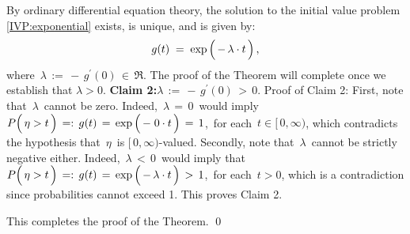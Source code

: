 \vskip 0.3cm
\noindent
By ordinary differential equation theory, the solution to the initial value problem \eqref{IVP:exponential}
exists, is unique, and is given by:
\begin{equation*}
g(t) \; = \; \exp\left(\,\overset{{\color{white}.}}{-}\,\lambda \cdot t\,\right),
\end{equation*}
where \,$\lambda \, := \, -\,g^{\prime}(0) \, \in \, \Re$.
The proof of the Theorem will complete once we establish that $\lambda > 0$.
\vskip 0.5cm
\noindent
\textbf{Claim 2:}\quad $\lambda \, := \, -\,g^{\prime}(0) \, > \, 0$.
\vskip 0.2cm
\noindent
Proof of Claim 2:\quad
First, note that \,$\lambda$\, cannot be zero.
Indeed, \,$\lambda \, = \, 0$\, would imply
\,$P\!\left(\,\eta \overset{{\color{white}.}}{>} t\,\right) \,=:\, g(t) \,=\, \exp\left(\,\overset{{\color{white}.}}{-}\;0 \cdot t\,\right) \,=\, 1$,\,
for each \,$t \in [\,0,\infty)$, which contradicts the hypothesis that \,$\eta$\, is $[\,0,\infty)$-valued.
Secondly, note that \,$\lambda$\, cannot be strictly negative either.
Indeed, \,$\lambda \, < \, 0$\, would imply that
\,$P\!\left(\,\eta \overset{{\color{white}.}}{>} t\,\right) \,=:\, g(t) \,=\, \exp\left(\,\overset{{\color{white}.}}{-}\,\lambda \cdot t\,\right) \,>\, 1$,\,
for each \,$t > 0$, which is a contradiction since probabilities cannot exceed 1.
This proves Claim 2.

\vskip 0.5cm
\noindent
This completes the proof of the Theorem.
\qed


\renewcommand{\theenumi}{\roman{enumi}}
\renewcommand{\labelenumi}{\textnormal{(\theenumi)}$\;\;$}

